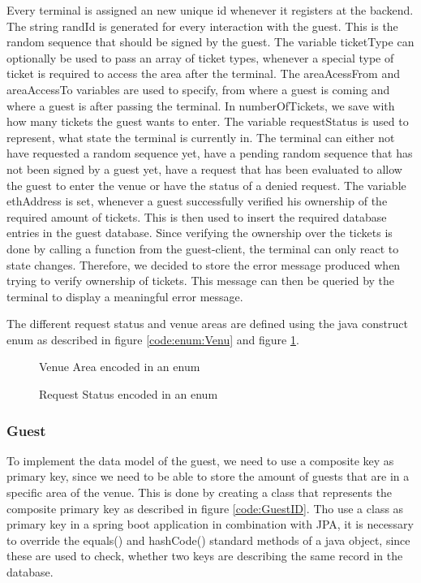 Every terminal is assigned an new unique id whenever it registers at the backend. The string randId is generated for every interaction with the guest. This is the random sequence that should be signed by the guest. The variable ticketType can optionally be used to pass an array of ticket types, whenever a special type of ticket is required to access the area after the terminal. The areaAcessFrom and areaAccessTo variables are used to specify, from where a guest is coming and where a guest is after passing the terminal. In numberOfTickets, we save with how many tickets the guest wants to enter. The variable requestStatus is used to represent, what state the terminal is currently in. The terminal can either not have requested a random sequence yet, have a pending random sequence that has not been signed by a guest yet, have a request that has been evaluated to allow the guest to enter the venue or have the status of a denied request.
The variable ethAddress is set, whenever a guest successfully verified his ownership of the required amount of tickets. This is then used to insert the required database entries in the guest database. Since verifying the ownership over the tickets is done by calling a function from the guest-client, the terminal can only react to state changes. Therefore, we decided to store the error message produced when trying to verify ownership of tickets. This message can then be queried by the terminal to display a meaningful error message. 

The different request status and venue areas are defined using the java construct enum as described in figure \ref{code:enum:Venu} and figure \ref{code:enum:Req}.

\begin{figure}[H]
    
    \caption{Venue Area encoded in an enum}
    \label{code:enum:Venu}
    
    \caption{Request Status encoded in an enum}
    \label{code:enum:Req}
\end{figure}

\subsubsection{Guest}
To implement the data model of the guest, we need to use a composite key as primary key, since we need to be able to store the amount of guests that are in a specific area of the venue. This is done by creating a class that represents the composite primary key as described in figure \ref{code:GuestID}. Tho use a class as primary key in a spring boot application in combination with JPA, it is necessary to override the equals() and hashCode() standard methods of a java object, since these are used to check, whether two keys are describing the same record in the database.

